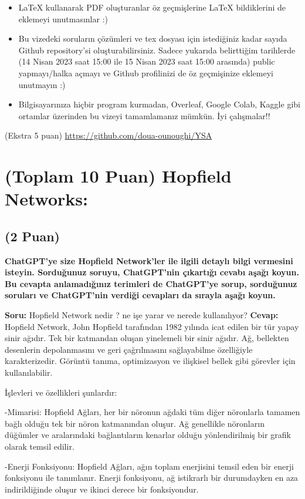 \documentclass[11pt]{article}
\begin{document}
\begin{itemize}
    \item LaTeX kullanarak PDF oluşturanlar öz geçmişlerine LaTeX bildiklerini de eklemeyi unutmasınlar :)
    \item Bu vizedeki soruların çözümleri ve tex dosyası için istediğiniz kadar sayıda Github repository'si oluşturabilirsiniz. Sadece yukarıda belirttiğim tarihlerde (14 Nisan 2023 saat 15:00 ile 15 Nisan 2023 saat 15:00 arasında) public yapmayı/halka açmayı ve Github profilinizi de öz geçmişinize eklemeyi unutmayın :)
    \item Bilgisayarınıza hiçbir program kurmadan, Overleaf, Google Colab, Kaggle gibi ortamlar üzerinden bu vizeyi tamamlamanız mümkün. İyi çalışmalar!!
\end{itemize}

(Ekstra 5 puan) \url{https://github.com/doua-ounoughi/YSA}

\newpage
\section{(Toplam 10 Puan) Hopfield Networks:}

\subsection{(2 Puan)} \textbf{ChatGPT’ye size Hopfield Network’ler ile ilgili detaylı bilgi vermesini isteyin. Sorduğunuz soruyu, ChatGPT'nin çıkartığı cevabı aşağı koyun. Bu cevapta anlamadığınız terimleri de ChatGPT’ye sorup, sorduğunuz soruları ve ChatGPT’nin verdiği cevapları da sırayla aşağı koyun.}

\textbf{Soru:} Hopfield Network nedir ? ne işe yarar ve nerede kullanılıyor?
\textbf{Cevap:} Hopfield Network, John Hopfield tarafından 1982 yılında icat edilen bir tür yapay sinir ağıdır. Tek bir katmandan oluşan yinelemeli bir sinir ağıdır. Ağ, bellekten desenlerin depolanmasını ve geri çağrılmasını sağlayabilme özelliğiyle karakterizedir. Görüntü tanıma, optimizasyon ve ilişkisel bellek gibi görevler için kullanılabilir.

İşlevleri ve özellikleri şunlardır:

-Mimarisi: Hopfield Ağları, her bir nöronun ağdaki tüm diğer nöronlarla tamamen bağlı olduğu tek bir nöron katmanından oluşur. Ağ genellikle nöronların düğümler ve aralarındaki bağlantıların kenarlar olduğu yönlendirilmiş bir grafik olarak temsil edilir.

-Enerji Fonksiyonu: Hopfield Ağları, ağın toplam enerjisini temsil eden bir enerji fonksiyonu ile tanımlanır. Enerji fonksiyonu, ağ istikrarlı bir durumdayken en aza indirildiğinde oluşur ve ikinci derece bir fonksiyondur.
\end{document}
